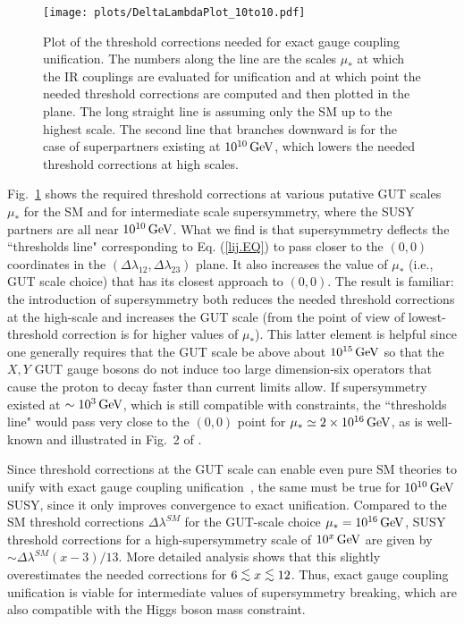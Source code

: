 \documentclass[12pt]{article}
\newcommand{\gev}{{\, {\rm GeV}}}
\newcommand{\lsim}{\lower.7ex\hbox{$\;\stackrel{\textstyle<}{\sim}\;$}}
\begin{document}
\begin{figure}[t]
\centering
\texttt{[image: plots/DeltaLambdaPlot\_10to10.pdf]}
\caption{Plot of the threshold corrections needed for exact gauge coupling unification. The numbers along the line are the scales $\mu_*$ at which the IR couplings are evaluated for unification and at which point the needed threshold corrections are computed and then plotted in the plane. The long straight line is assuming only the SM up to the highest scale. The second line that branches downward is for the case of superpartners existing at $10^{10}\gev$, which lowers the needed threshold corrections at high scales.}
\label{DeltaLambdaPlot_10to10.FIG}
\end{figure}

Fig.~\ref{DeltaLambdaPlot_10to10.FIG} shows the required threshold corrections at various putative GUT scales $\mu_*$ for the SM and for intermediate scale supersymmetry, where the SUSY partners are all near $10^{10}\gev$. What we find is that supersymmetry deflects the ``thresholds line" corresponding to Eq. (\ref{lij.EQ}) to pass closer to the $(0,0)$ coordinates in the $(\Delta\lambda_{12},\Delta\lambda_{23})$ plane. It also increases the value of $\mu_*$ (i.e., GUT scale choice) that has its closest approach to $(0,0)$. The result is familiar: the introduction of supersymmetry both reduces the needed threshold corrections at the high-scale and increases the GUT scale (from the point of view of lowest-threshold correction is for higher values of $\mu_*$). This latter element is helpful since one generally requires that the GUT scale be above about $10^{15}\gev$ so that the $X,Y$ GUT gauge bosons do not induce too large dimension-six operators that cause the proton to decay faster than current limits allow. If supersymmetry existed at $\sim10^3\gev$, which is still compatible with constraints, the ``thresholds line" would pass very close to the $(0,0)$ point for $\mu_*\simeq 2\times 10^{16}\gev$, as is well-known and illustrated in Fig.~2 of \cite{Ellis:2015jwa}.

Since threshold corrections at the GUT scale can enable even pure SM theories to unify with exact gauge coupling unification~\cite{Lavoura:1993su, Ellis:2015jwa, Mambrini:2015vna}, the same must be true for $10^{10}\gev$ SUSY, since it only improves convergence to exact unification.  Compared to the SM threshold corrections $\Delta\lambda^{SM}$ for the GUT-scale choice $\mu_*=10^{16}\gev$, SUSY threshold corrections for a high-supersymmetry scale of $10^x\gev$ are given by $\sim \Delta\lambda^{SM}(x-3)/13$. More detailed analysis shows that this slightly overestimates the needed corrections for $6\lsim x\lsim 12$. Thus, exact gauge coupling unification is viable for intermediate values of supersymmetry breaking, which are also compatible with the Higgs boson mass constraint.
\end{document}
